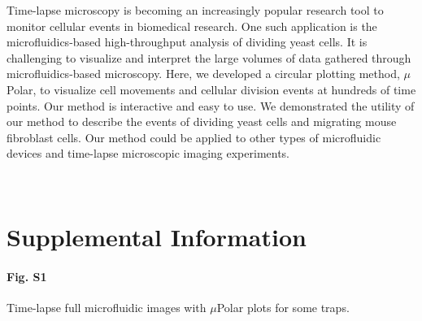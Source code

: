 \documentclass[conference]{IEEEtran}
\begin{document}

 

Time-lapse microscopy is becoming an increasingly popular research tool to monitor cellular events in biomedical research. One such application is the microfluidics-based high-throughput analysis of dividing yeast cells. It is challenging to visualize and interpret the large volumes of data gathered through microfluidics-based microscopy. Here, we developed a circular plotting method, $\mu$Polar, to visualize cell movements and cellular division events at hundreds of time points. Our method is interactive and easy to use. We demonstrated the utility of our method to describe the events of dividing yeast cells and migrating mouse fibroblast cells. Our method could be applied to other types of microfluidic devices and time-lapse microscopic imaging experiments.

\
\section{Supplemental Information}

\paragraph*{Fig. S1}
\label{Fig_S1}
{
Time-lapse full microfluidic images with $\mu$Polar plots for some traps}. 
\end{document}
